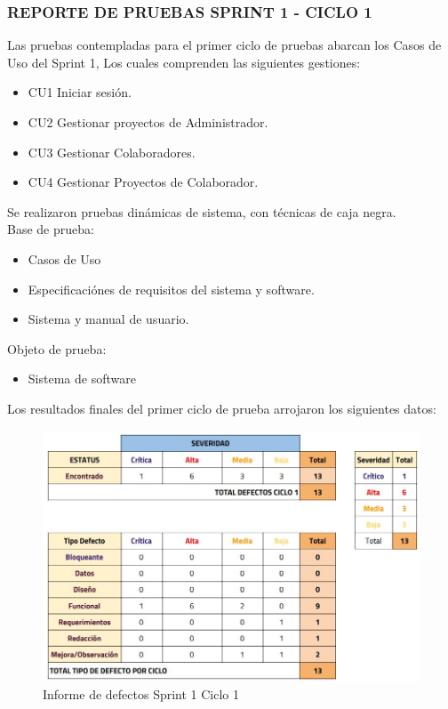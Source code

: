 \hspace{.85cm}

\subsubsection{REPORTE DE PRUEBAS SPRINT 1 - CICLO 1}

Las pruebas contempladas para el primer ciclo de pruebas abarcan los Casos de Uso del Sprint 1, Los cuales comprenden las siguientes gestiones:

\begin{itemize}
	\item CU1 Iniciar sesión.
	\item CU2 Gestionar proyectos de Administrador.
	\item CU3 Gestionar Colaboradores.
	\item CU4 Gestionar Proyectos de Colaborador.
\end{itemize}

Se realizaron pruebas dinámicas de sistema, con técnicas de caja negra.\\

Base de prueba:
\begin{itemize}
	\item Casos de Uso
	\item Especificaciónes de requisitos del sistema y software.
	\item Sistema y manual de usuario.
\end{itemize}

Objeto de prueba:
\begin{itemize}
	\item Sistema de software
\end{itemize}

\newpage

Los resultados finales del primer ciclo de prueba arrojaron los siguientes datos:

\begin{figure}[H]
	\begin{center}
		\includegraphics[width=.95\textwidth]{images/pruebas/s1c1}
		\caption{Informe de defectos Sprint 1 Ciclo 1}
		\label{fig:infos1c1}
	\end{center}
\end{figure}

